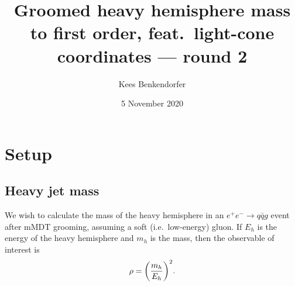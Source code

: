 \documentclass[11pt,twoside,reqno]{amsart}
\title{Groomed heavy hemisphere mass to first order, feat.\ light-cone coordinates --- round 2}
\author{Kees Benkendorfer}
\date{5 November 2020}
\theoremstyle{plain}
\theoremstyle{remark}
\theoremstyle{definition}
\theoremstyle{remark}
\theoremstyle{definition}
\theoremstyle{definition}
\begin{document}
\maketitle

\section{Setup}

\subsection{Heavy jet mass}

	We wish to calculate the mass of the heavy hemisphere in an $e^+ e^- \to q\bar q g$ event after mMDT grooming, assuming a soft (i.e.\ low-energy) gluon. If $E_h$ is the energy of the heavy hemisphere and $m_h$ is the mass, then the observable of interest is \cite{larkoski_improving_2020}
	\begin{equation}
		\rho = \qty(\frac{m_h}{E_h})^2.
	\end{equation}
\end{document}
